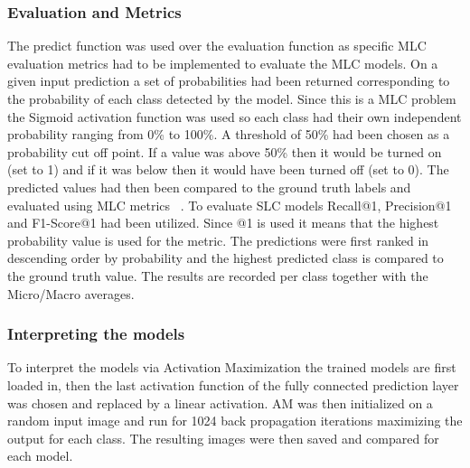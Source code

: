 \documentclass{IEEEtran}
\begin{document}
\subsubsection{Evaluation and Metrics}
The predict function was used over the evaluation function as specific MLC evaluation metrics had to be implemented to evaluate the MLC models. On a given input prediction a set of probabilities had been returned corresponding to the probability of each class detected by the model. Since this is a MLC problem the Sigmoid activation function was used so each class had their own independent probability ranging from 0\% to 100\%. A threshold of 50\% had been chosen as a probability cut off point. If a value was above 50\% then it would be turned on (set to 1) and if it was below then it would have been turned off (set to 0). The predicted values had then been compared to the ground truth labels and evaluated using MLC metrics ~\cite{6471714}. To evaluate SLC models Recall@1, Precision@1 and F1-Score@1 had been utilized. Since @1 is used it means that the highest probability value is used for the metric. The predictions were first ranked in descending order by probability and the highest predicted class is compared to the ground truth value. The results are recorded per class together with the Micro/Macro averages.
                      
\subsubsection{Interpreting the models}
To interpret the models via Activation Maximization the trained models are first loaded in, then the last activation function of the fully connected prediction layer was chosen and replaced by a linear activation. AM was then initialized on a random input image and run for 1024 back propagation iterations maximizing the output for each class. The resulting images were then saved and compared for each model.
\end{document}
